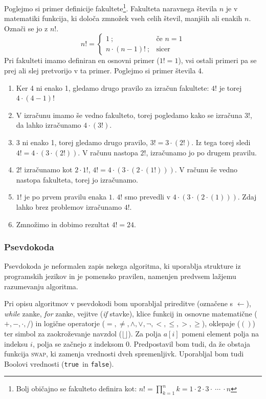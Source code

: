 \documentclass[a4paper,oneside,12pt]{article}
\def\False{\texttt{false}}
\def\True{\texttt{true}}
\begin{document}
Poglejmo si primer definicije fakultete\footnote{Bolj običajno se fakulteto definira kot:
$n! = \displaystyle\prod_{k=1}^{n} k = 1 \cdot 2 \cdot 3 \cdot \ \cdots\  \cdot n$}. Fakulteta naravnega števila $n$ je v matematiki
funkcija, ki določa zmnožek vseh celih števil, manjših ali enakih $n$. Označi se jo z $n!$.
\[
n! = \left\{ 
\begin{array}{rl}
     1             \ ;& \mbox{če $n = 1$} \\
     n \cdot (n-1)!\ ;& \mbox{sicer}
\end{array} \right.
\]
Pri fakulteti imamo definiran en osnovni primer ($1! = 1$), vsi ostali primeri pa se prej
ali slej pretvorijo v ta primer. Poglejmo si primer števila 4.
\begin{enumerate}
  \item Ker 4 ni enako 1, gledamo drugo pravilo za izračun fakultete: $4!$ je torej $4
    \cdot \left(4 - 1\right)!$
  \item V izračunu imamo še vedno fakulteto, torej pogledamo kako se izračuna $3!$, da
    lahko izračunamo $4 \cdot \left(3!\right)$.
  \item 3 ni enako 1, torej gledamo drugo pravilo, $3! = 3 \cdot (2!)$. Iz tega
    torej sledi \mbox{$4! =
    4 \cdot \left(3 \cdot \left(2!\right)\right)$}. V računu nastopa $2!$, izračunamo jo po drugem pravilu.
  \item $2!$ izračunamo kot $2 \cdot 1!$, $4! = 4 \cdot \left(3 \cdot \left(2 \cdot \left(1!\right)\right)\right)$. V računu še
    vedno nastopa fakulteta, torej jo izračunamo.
  \item $1!$ je po prvem pravilu enaka $1$. $4!$ smo prevedli v $4 \cdot \left(3 \cdot \left(2 \cdot
    \left(1\right)\right)\right)$. Zdaj lahko brez problemov izračunamo $4!$.
  \item Zmnožimo in dobimo rezultat $4! = 24$.
\end{enumerate}

\subsubsection{Psevdokoda}
Psevdokoda je neformalen zapis nekega algoritma, ki uporablja strukture iz programskih
jezikov in je pomensko pravilen, namenjen predvsem lažjemu razumevanju algoritma.

Pri opisu algoritmov v psevdokodi bom uporabljal prireditve (označene s $\gets$), 
\emph{while} zanke, \emph{for} zanke, vejitve (\emph{if} stavke), klice 
funkcij in osnovne  matematične ($+, -, \cdot, /$) in logične operatorje ($=, 
\neq, \wedge, \vee, \neg, <, \leq, >, \geq$), oklepaje ($()$) ter simbol za zaokroževanje
navzdol ($\lfloor\rfloor$). 
Za polja $a[i]$ pomeni element polja na indeksu $i$, polja se začnejo z indeksom $0$.
Predpostavil bom tudi, da že obstaja funkcija \textsc{swap}, ki zamenja vrednosti dveh
spremenljivk. Uporabljal bom tudi Boolovi vrednosti (\True\ in \False).
\end{document}
